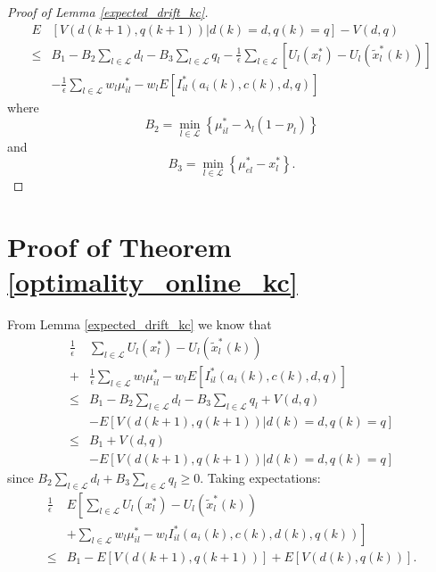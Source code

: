 \documentclass[conference]{IEEEtran}
\begin{document}
\begin{proof}[Proof of Lemma \ref{expected_drift_kc}]
\begin{align*}
	E & \left[ V(d(k+1),q(k+1)) | d(k)=d, q(k)=q \right] - V(d,q) \\
 	\leq & B_1 - B_2 \sum_{l \in \mathcal{L}} d_l - B_3 \sum_{l \in \mathcal{L}} q_l - \frac{1}{\epsilon} \sum_{l \in \mathcal{L}} [ U_l(x_l^*) - U_l(\tilde{x}_l^*(k)) ] \\
 	& - \frac{1}{\epsilon} \sum_{l \in \mathcal{L}} w_l \mu^*_{il} - w_l E \left[ I_{il}^*(a_i(k),c(k),d,q) \right]
\end{align*}
where
\begin{equation*}
	B_2 = \min_{l \in \mathcal{L}} \left\{ \mu^*_{il} - \lambda_l (1-p_l) \right\}
\end{equation*}
and
\begin{equation*}
	B_3 = \min_{l \in \mathcal{L}} \left\{ \mu^*_{el} - x_l^* \right\}.
\end{equation*}
\end{proof}

\section{Proof of Theorem \ref{optimality_online_kc}}

From Lemma \ref{expected_drift_kc} we know that
\begin{align*}
	\frac{1}{\epsilon} & \sum_{l \in \mathcal{L}} U_l(x_l^*) - U_l(\tilde{x}_l^*(k)) \\
	+ & \frac{1}{\epsilon} \sum_{l \in \mathcal{L}} w_l \mu^*_{il} - w_l E \left[ I_{il}^*(a_i(k),c(k),d,q) \right] \\
 	\leq & B_1 - B_2 \sum_{l \in \mathcal{L}} d_l - B_3 \sum_{l \in \mathcal{L}} q_l + V(d,q) \\
 	& - E \left[ V(d(k+1),q(k+1)) | d(k)=d, q(k)=q \right] \\
 	\leq & B_1 + V(d,q) \\
 	& - E \left[ V(d(k+1),q(k+1)) | d(k)=d, q(k)=q \right]
\end{align*}
since $B_2 \sum_{l \in \mathcal{L}} d_l + B_3 \sum_{l \in \mathcal{L}} q_l \geq 0$. Taking expectations:
\begin{align*}
	\frac{1}{\epsilon} & E \left[ \sum_{l \in \mathcal{L}} U_l(x_l^*) - U_l(\tilde{x}_l^*(k)) \right. \\
	& \left. + \sum_{l \in \mathcal{L}} w_l \mu^*_{il} - w_l I_{il}^*(a_i(k),c(k),d(k),q(k)) \right] \\
	\leq & B_1 - E\left[ V(d(k+1),q(k+1)) \right] + E\left[ V(d(k),q(k)) \right].
\end{align*}
\end{document}
